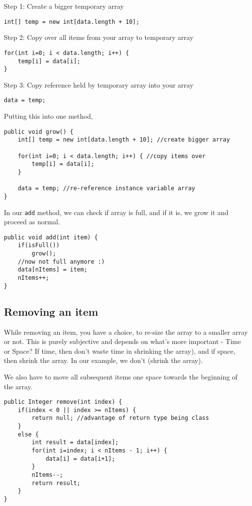 Step 1: Create a bigger temporary array
\begin{lstlisting}
int[] temp = new int[data.length + 10];
\end{lstlisting}
Step 2: Copy over all items from your array to temporary array	
\begin{lstlisting}
for(int i=0; i < data.length; i++) {
	temp[i] = data[i];
}
\end{lstlisting}
Step 3: Copy reference held by temporary array into your array
\begin{lstlisting}
data = temp;
\end{lstlisting}

Putting this into one method,

\begin{lstlisting}
public void grow() {
	int[] temp = new int[data.length + 10]; //create bigger array
	
	for(int i=0; i < data.length; i++) { //copy items over 
		temp[i] = data[i];
	}
	
	data = temp; //re-reference instance variable array
}	
\end{lstlisting}

In our \texttt{add} method, we can check if array is full, and if it is, we grow it and proceed as normal.

\begin{lstlisting}
public void add(int item) {
	if(isFull())
		grow();
	//now not full anymore :)
	data[nItems] = item;
	nItems++;
}
\end{lstlisting}

\subsection{Removing an item}

While removing an item, you have a choice, to re-size the array to a smaller array or not. This is purely subjective and depends on what's more important - Time or Space? If time, then don't waste time in shrinking the array), and if space, then shrink the array. In our example, we don't (shrink the array).

We also have to move all subsequent items one space towards the beginning of the array.

\begin{lstlisting}
public Integer remove(int index) {
	if(index < 0 || index >= nItems) {
		return null; //advantage of return type being class
	}
	else {
		int result = data[index];
		for(int i=index; i < nItems - 1; i++) {
			data[i] = data[i+1];
		}
		nItems--;
		return result;
	}
}
\end{lstlisting}

